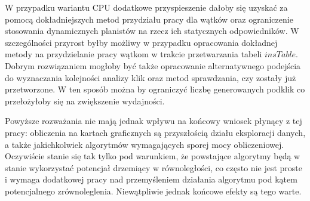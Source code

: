 \documentclass[12pt]{article}
\begin{document}
W przypadku wariantu CPU dodatkowe przyspieszenie dałoby się uzyskać za pomocą dokładniejszych metod przydziału pracy dla wątków oraz ograniczenie stosowania dynamicznych planistów na rzecz ich statycznych odpowiedników. W szczególności przyrost byłby możliwy w przypadku opracowania dokładnej metody na przydzielanie pracy wątkom w trakcie przetwarzania tabeli $ insTable $. Dobrym rozwiązaniem mogłoby być także opracowanie alternatywnego podejścia do wyznaczania kolejności analizy klik oraz metod sprawdzania, czy zostały już przetworzone. W ten sposób można by ograniczyć liczbę generowanych podklik co przełożyłoby się na zwiększenie wydajności.  
 
Powyższe rozważania nie mają jednak wpływu na końcowy wniosek płynący z tej pracy: obliczenia na kartach graficznych są przyszłością działu eksploracji danych, a także jakichkolwiek algorytmów wymagających sporej mocy obliczeniowej. Oczywiście stanie się tak tylko pod warunkiem, że powstające algorytmy będą w stanie wykorzystać potencjał drzemiący w równoległości, co często nie jest proste i wymaga dodatkowej pracy nad przemyśleniem działania algorytmu pod kątem potencjalnego zrównoleglenia. Niewątpliwie jednak końcowe efekty są tego warte.
 
\newpage
\end{document}
